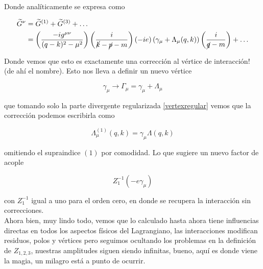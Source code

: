 \documentclass[tickz]{article}
\numberwithin{equation}{section}
\begin{document}
Donde analíticamente se expresa como

\begin{equation}\label{key}
\begin{aligned}
\widetilde{G}^{\nu} &= \widetilde{G}^{(1)} + \widetilde{G}^{(3)} + \dots\\
&= \left(\frac{-ig^{\mu\nu}}{(q-k)^2-\mu^2}\right)\left(\frac{i}{\cancel{k}-\cancel{p}-m}\right) (-ie)\left( \gamma_{\mu}  + \Lambda_{\mu}(q,k)\right)\left(\frac{i}{\cancel{q}-m}\right) + \dots
\end{aligned} 
\end{equation}

Donde vemos que esto es exactamente una corrección al vértice de interacción! (de ahí el nombre). Esto nos lleva a definir un nuevo vértice

\begin{equation}\label{key}
\gamma_{\mu} \longrightarrow \Gamma_{\mu}= \gamma_{\mu} + \Lambda_{\mu}
\end{equation}

que tomando solo la parte divergente regularizada \ref{vertexregular} vemos que la corrección podemos escribirla como

\begin{equation}\label{key}
\Lambda^{(1)}_{\mu}(q,k) = \gamma_{\mu} \Lambda(q,k)
\end{equation}

omitiendo el supraindice $ (1) $ por comodidad. Lo que sugiere un nuevo factor de acople

\begin{equation}\label{vertexz1}
Z^{-1}_1\left(-e \gamma_{\mu}\right)
\end{equation}

con $ Z^{-1}_1 $ igual a uno para el orden cero, en donde se recupera la interacción sin correcciones.\\

Ahora bien, muy lindo todo, vemos que lo calculado hasta ahora tiene influencias directas en todos los aspectos físicos del Lagrangiano, las interacciones modifican residuos, polos y vértices pero seguimos ocultando los problemas en la definición de $ Z_{1,2,3} $, nuestras amplitudes siguen siendo infinitas, bueno, aquí es donde viene la magia, un milagro está a punto de ocurrir.\\
\end{document}
